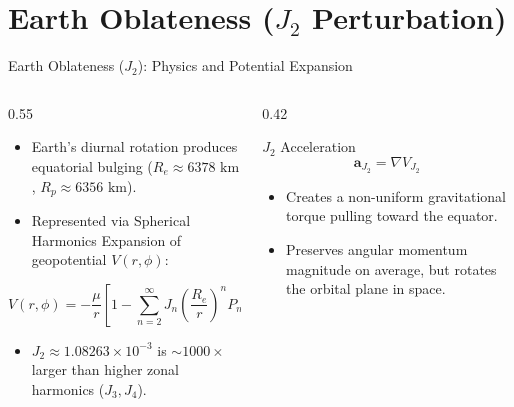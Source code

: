 \documentclass[aspectratio=169,11pt]{beamer}
\begin{document}
\section{Earth Oblateness ($J_2$ Perturbation)}

\begin{frame}{Earth Oblateness ($J_2$): Physics and Potential Expansion}
    \begin{columns}
        \begin{column}{0.55\textwidth}
            \begin{itemize}
                \item Earth's diurnal rotation produces equatorial bulging ($R_e \approx 6378\text{ km}$, $R_p \approx 6356\text{ km}$).
                \item Represented via Spherical Harmonics Expansion of geopotential $V(r, \phi)$:
            \end{itemize}
            \begin{equation*}
                V(r,\phi) = -\frac{\mu}{r}\left[ 1 - \sum_{n=2}^{\infty} J_n \left(\frac{R_e}{r}\right)^n P_n(\sin\phi) \right]
            \end{equation*}
            \begin{itemize}
                \item $J_2 \approx 1.08263 \times 10^{-3}$ is $\sim 1000\times$ larger than higher zonal harmonics ($J_3, J_4$).
            \end{itemize}
        \end{column}

        \begin{column}{0.42\textwidth}
            \begin{block}{$J_2$ Acceleration}
                $$\mathbf{a}_{J_2} = \nabla V_{J_2}$$
                \begin{itemize}
                    \item Creates a non-uniform gravitational torque pulling toward the equator.
                    \item Preserves angular momentum magnitude on average, but rotates the orbital plane in space.
                \end{itemize}
            \end{block}
        \end{column}
    \end{columns}
\end{frame}
\end{document}
